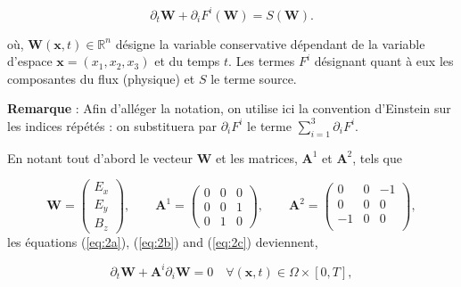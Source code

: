 \documentclass[a4paper,oneside,10pt]{report}
\begin{document}
\begin{equation}
\label{eq:sysh}
\partial_t \mathbf{W} +  \partial_i F^i(\mathbf{W}) = S(\mathbf{W}).
\end{equation}

où, $\mathbf{W}(\mathbf{x},t) \in \mathbb{R}^n$ désigne la variable conservative dépendant de la variable d'espace $\mathbf{x} = (x_1,x_2,x_3)$ et du temps $t$. Les termes $F^i$ désignant quant à eux les composantes du flux (physique) et $S$ le terme source.\newline

\textbf{Remarque } : Afin d'alléger la notation, on utilise ici la convention d'Einstein sur les indices répétés : on substituera par $\partial_i F^i$ le terme $\sum_{i=1}^{3}\partial _i F^i$.\newline


En notant tout d'abord le vecteur $\mathbf{W}$ et les matrices, $\mathbf{A}^1$ et $\mathbf{A}^2$, tels que


\begin{equation}
\mathbf{W}=
\begin{pmatrix}
E_x\\
E_y\\
B_z
\end{pmatrix},
\qquad
\mathbf{A}^1=
\begin{pmatrix}
0 & 0 & 0\\
0 & 0 & 1\\
0 & 1 & 0
\end{pmatrix},
\qquad
\mathbf{A}^2=
\begin{pmatrix}
0 & 0 & -1\\
0 & 0 & 0\\
-1 & 0 & 0\\
\end{pmatrix},
\end{equation}
les équations (\ref{eq:2a}), (\ref{eq:2b}) and (\ref{eq:2c}) deviennent,

\begin{equation}
\label{eq:sysh2}
\partial_t \mathbf{W} +  \mathbf{A}^i\partial_i \mathbf{W} = 0 \quad \forall (\mathbf{x},t) \in \Omega \times [0,T],
\end{equation}
\end{document}
